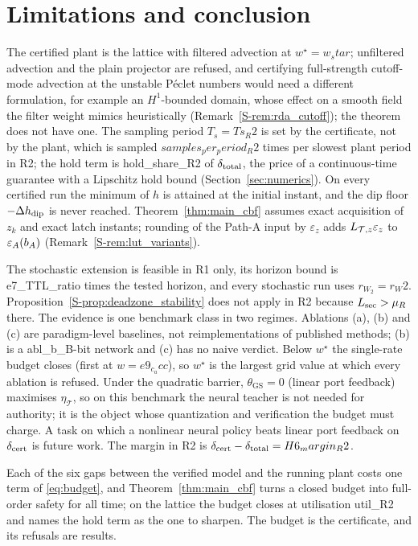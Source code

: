 \section{Limitations and conclusion}
\label{sec:limits}

The certified plant is the lattice with filtered advection at $w^\star = {{w_star}}$; unfiltered advection and the plain projector are refused, and certifying full-strength cutoff-mode advection at the unstable P\'eclet numbers would need a different formulation, for example an $H^1$-bounded domain, whose effect on a smooth field the filter weight mimics heuristically (Remark~\ref{S-rem:rda_cutoff}); the theorem does not have one. The sampling period $T_s = {{Ts_R2}}$ is set by the certificate, not by the plant, which is sampled ${{samples_per_period_R2}}$ times per slowest plant period in R2; the hold term is {{hold_share_R2}} of $\delta_{\mathrm{total}}$, the price of a continuous-time guarantee with a Lipschitz hold bound (Section~\ref{sec:numerics}). On every certified run the minimum of $h$ is attained at the initial instant, and the dip floor $-\Delta h_{\mathrm{dip}}$ is never reached. Theorem~\ref{thm:main_cbf} assumes exact acquisition of $z_k$ and exact latch instants; rounding of the Path-A input by $\varepsilon_z$ adds $L_{\mathcal{T},z}\varepsilon_z$ to $\varepsilon_A(b_A)$ (Remark~\ref{S-rem:lut_variants}).

The stochastic extension is feasible in R1 only, its horizon bound is {{e7_TTL_ratio}} times the tested horizon, and every stochastic run uses $r_{W_2} = {{r_W2}}$. Proposition~\ref{S-prop:deadzone_stability} does not apply in R2 because $L_{\mathrm{sec}} > \mu_R$ there. The evidence is one benchmark class in two regimes. Ablations (a), (b) and (c) are paradigm-level baselines, not reimplementations of published methods; (b) is a {{abl_b_B}}-bit network and (c) has no naive verdict. Below $w^\star$ the single-rate budget closes (first at $w = {{e9_c_acc}}$), so $w^\star$ is the largest grid value at which every ablation is refused. Under the quadratic barrier, $\theta_{\mathrm{GS}} = 0$ (linear port feedback) maximises $\eta_{\mathcal{T}}$, so on this benchmark the neural teacher is not needed for authority; it is the object whose quantization and verification the budget must charge. A task on which a nonlinear neural policy beats linear port feedback on $\delta_{\mathrm{cert}}$ is future work. The margin in R2 is $\delta_{\mathrm{cert}} - \delta_{\mathrm{total}} = {{H6_margin_R2}}$.

Each of the six gaps between the verified model and the running plant costs one term of \eqref{eq:budget}, and Theorem~\ref{thm:main_cbf} turns a closed budget into full-order safety for all time; on the lattice the budget closes at utilisation {{util_R2}} and names the hold term as the one to sharpen. The budget is the certificate, and its refusals are results.

